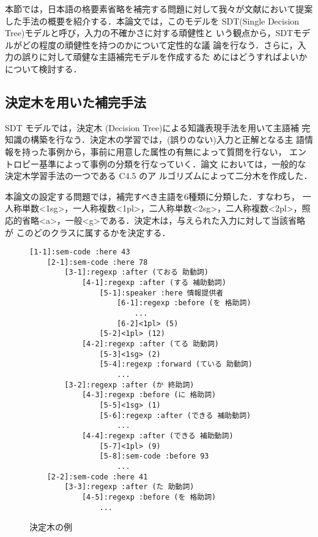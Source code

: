 本節では，日本語の格要素省略を補完する問題に対して我々が文献\cite{主語
補完}において提案した手法の概要を紹介する．本論文では，このモデルを
SDT(Single Decision Tree)モデルと呼び，入力の不確かさに対する頑健性と
いう観点から，SDTモデルがどの程度の頑健性を持つのかについて定性的な議
論を行なう．さらに，入力の誤りに対して頑健な主語補完モデルを作成するた
めにはどうすればよいかについて検討する．


\subsection{決定木を用いた補完手法}
\label{節:SDTの頑健性}

SDT モデルでは，決定木 (Decision Tree)による知識表現手法を用いて主語補
完知識の構築を行なう．決定木の学習では，(誤りのない)入力と正解となる主
語情報を持った事例から，事前に用意した属性の有無によって質問を行ない，
エントロピー基準によって事例の分類を行なっていく．論文\cite{主語補完}
においては，一般的な決定木学習手法の一つである C4.5\cite{Quinlan} のア
ルゴリズムによって二分木を作成した．

本論文の設定する問題では，補完すべき主語を6種類に分類した．すなわち，
一人称単数<1sg>，一人称複数<1pl>，二人称単数<2sg>，二人称複数<2pl>，照
応的省略<a>，一般<g>である．決定木は，与えられた入力に対して当該省略が
このどのクラスに属するかを決定する．

\begin{figure}
\begin{center}
\renewcommand{\baselinestretch}{}\large\normalsize
\begin{boxit}
\begin{verbatim}
[1-1]:sem-code :here 43
    [2-1]:sem-code :here 78
        [3-1]:regexp :after (ておる 助動詞)
            [4-1]:regexp :after (する 補助動詞)
                [5-1]:speaker :here 情報提供者
                    [6-1]:regexp :before (を 格助詞)
                        ...
                    [6-2]<1pl> (5)
                [5-2]<1pl> (12)
            [4-2]:regexp :after (てる 助動詞)
                [5-3]<1sg> (2)
                [5-4]:regexp :forward (ている 助動詞)
                    ...
        [3-2]:regexp :after (か 終助詞)
            [4-3]:regexp :before (に 格助詞)
                [5-5]<1sg> (1)
                [5-6]:regexp :after (できる 補助動詞)
                    ...
            [4-4]:regexp :after (できる 補助動詞)
                [5-7]<1pl> (9)
                [5-8]:sem-code :before 93
                    ...
    [2-2]:sem-code :here 41
        [3-3]:regexp :after (た 助動詞)
            [4-5]:regexp :before (を 格助詞)
                ...

\end{verbatim}
\end{boxit}
\renewcommand{\baselinestretch}{}\large\normalsize
\vspace{3mm}
\caption{決定木の例}
\label{表:決定木}
\end{center}
\end{figure}

